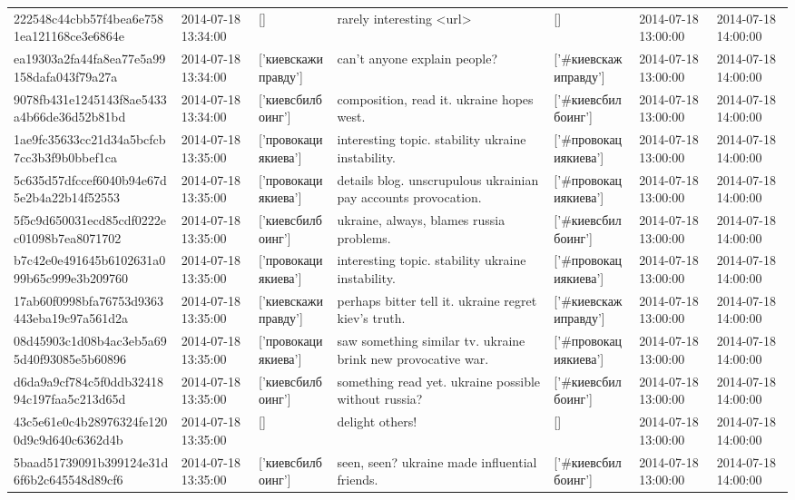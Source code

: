 \begin{tabular}{lllllll}
222548c44cbb57f4bea6e7581ea121168ce3e6864e & 2014-07-18 13:34:00 & [] & rarely interesting <url> & [] & 2014-07-18 13:00:00 & 2014-07-18 14:00:00 \\
ea19303a2fa44fa8ea77e5a99158dafa043f79a27a & 2014-07-18 13:34:00 & ['киевскажиправду'] & can't anyone explain people? & ['#киевскажиправду'] & 2014-07-18 13:00:00 & 2014-07-18 14:00:00 \\
9078fb431e1245143f8ae5433a4b66de36d52b81bd & 2014-07-18 13:34:00 & ['киевсбилбоинг'] & composition, read it. ukraine hopes west. & ['#киевсбилбоинг'] & 2014-07-18 13:00:00 & 2014-07-18 14:00:00 \\
1ae9fc35633cc21d34a5bcfcb7cc3b3f9b0bbef1ca & 2014-07-18 13:35:00 & ['провокациякиева'] & interesting topic. stability ukraine instability. & ['#провокациякиева'] & 2014-07-18 13:00:00 & 2014-07-18 14:00:00 \\
5c635d57dfccef6040b94e67d5e2b4a22b14f52553 & 2014-07-18 13:35:00 & ['провокациякиева'] & details blog. unscrupulous ukrainian pay accounts provocation. & ['#провокациякиева'] & 2014-07-18 13:00:00 & 2014-07-18 14:00:00 \\
5f5c9d650031ecd85cdf0222ec01098b7ea8071702 & 2014-07-18 13:35:00 & ['киевсбилбоинг'] & ukraine, always, blames russia problems. & ['#киевсбилбоинг'] & 2014-07-18 13:00:00 & 2014-07-18 14:00:00 \\
b7c42e0e491645b6102631a099b65c999e3b209760 & 2014-07-18 13:35:00 & ['провокациякиева'] & interesting topic. stability ukraine instability. & ['#провокациякиева'] & 2014-07-18 13:00:00 & 2014-07-18 14:00:00 \\
17ab60f0998bfa76753d9363443eba19c97a561d2a & 2014-07-18 13:35:00 & ['киевскажиправду'] & perhaps bitter tell it. ukraine regret kiev's truth. & ['#киевскажиправду'] & 2014-07-18 13:00:00 & 2014-07-18 14:00:00 \\
08d45903c1d08b4ac3eb5a695d40f93085e5b60896 & 2014-07-18 13:35:00 & ['провокациякиева'] & saw something similar tv. ukraine brink new provocative war. & ['#провокациякиева'] & 2014-07-18 13:00:00 & 2014-07-18 14:00:00 \\
d6da9a9cf784c5f0ddb3241894c197faa5c213d65d & 2014-07-18 13:35:00 & ['киевсбилбоинг'] & something read yet. ukraine possible without russia? & ['#киевсбилбоинг'] & 2014-07-18 13:00:00 & 2014-07-18 14:00:00 \\
43c5e61e0c4b28976324fe1200d9c9d640c6362d4b & 2014-07-18 13:35:00 & [] & delight others! & [] & 2014-07-18 13:00:00 & 2014-07-18 14:00:00 \\
5baad51739091b399124e31d6f6b2c645548d89cf6 & 2014-07-18 13:35:00 & ['киевсбилбоинг'] & seen, seen? ukraine made influential friends. & ['#киевсбилбоинг'] & 2014-07-18 13:00:00 & 2014-07-18 14:00:00 \\

\end{tabular}
